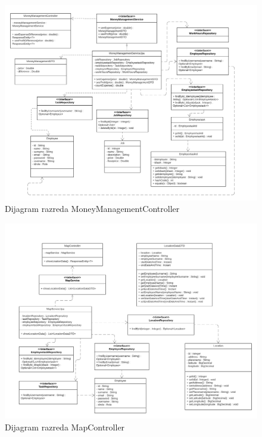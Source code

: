 			
			\eject
			\begin{figure}[H]
					\centering
					\includegraphics[width=\textwidth]{slike/fixMoneyManagementController.png}
					\caption{Dijagram razreda MoneyManagementController}
				\end{figure}
			
			
			\eject
			
			
			\begin{figure}[H]
					\centering
					\includegraphics[width=\textwidth]{slike/fixMapController.png}
					\caption{Dijagram razreda MapController}
				\end{figure}
			
